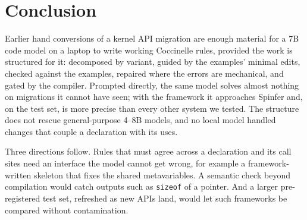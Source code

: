 \section{Conclusion}
\label{sec:conclusion}

Earlier hand conversions of a kernel API migration are enough material for a 7B code model on a laptop to write
working Coccinelle rules, provided the work is structured for it: decomposed by variant, guided by the examples'
minimal edits, checked against the examples, repaired where the errors are mechanical, and gated by the compiler.
Prompted directly, the same model solves almost nothing on migrations it cannot have seen; with the framework it
approaches Spinfer and, on the test set, is more precise than every other system we tested. The structure does not rescue
general-purpose 4--8B models, and no local model handled changes that couple a declaration with its uses.

Three directions follow. Rules that must agree across a declaration and its call sites need an interface the model
cannot get wrong, for example a framework-written skeleton that fixes the shared metavariables. A semantic check
beyond compilation would catch outputs such as \texttt{sizeof} of a pointer. And a larger pre-registered test set,
refreshed as new APIs land, would let such frameworks be compared without contamination.
